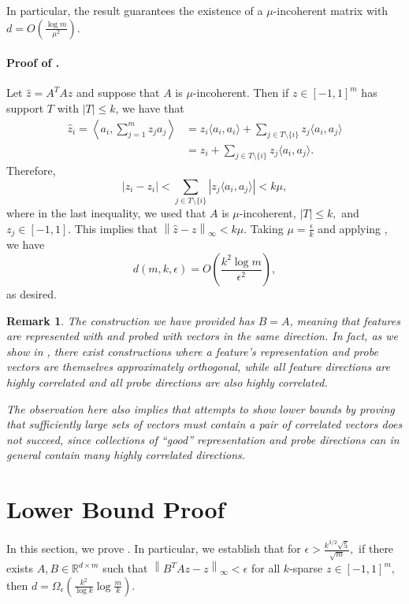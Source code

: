 \documentclass[11pt]{article}
\newtheorem{remark}[theorem]{Remark}
\newcommand{\RR}{\mathbb{R}}
\newcommand{\norm}[1]{\left\|#1\right\|}
\begin{document}
In particular, the result guarantees the existence of a $\mu$-incoherent matrix with $d = O(\frac{\log m}{\mu^2}).$ 

\paragraph{Proof of .}
Let $\hat{z}=A^TAz$ and suppose that $A$ is $\mu$-incoherent. Then if $z\in [-1,1]^m$ has support $T$ with $|T|\le k$, we have that
\begin{align}
    \hat{z}_i = \left\langle a_i, \sum_{j=1}^m z_ja_j\right\rangle
    &= z_i\langle a_i,a_i\rangle + \sum_{j\in T\setminus\{i\}} z_j\langle a_i,a_j\rangle\\
    &= z_i + \sum_{j\in T\setminus\{i\}} z_j\langle a_i,a_j\rangle.
\end{align}
Therefore,
\begin{equation}
    \left|\hat{z}_i - z_i\right| < \sum_{j\in T\setminus\{i\}} |z_j\langle a_i,a_j\rangle| < k\mu,
\end{equation}
where in the last inequality, we used that $A$ is $\mu$-incoherent, $|T|\le k,$ and $z_j\in [-1,1]$. This implies that $\norm{\hat{z}-z}_\infty < k\mu.$
Taking $\mu = \frac{\epsilon}{k}$ and applying , we have
\begin{equation}
    d(m,k,\epsilon) = O\left(\frac{k^2\log m}{\epsilon^2}\right),
\end{equation}
as desired.

\begin{remark}
The construction we have provided has $B=A$, meaning that features are represented with and probed with vectors in the same direction. In fact, as we show in , there exist constructions where a feature's representation and probe vectors are themselves approximately orthogonal, while all feature directions are highly correlated and all probe directions are also highly correlated.

The observation here also implies that attempts to show lower bounds by proving that sufficiently large sets of vectors must contain a pair of correlated vectors does not succeed, since collections of ``good'' representation and probe directions can in general contain many highly correlated directions.
\end{remark}

\section{Lower Bound Proof}\label{sec:lower-bound}
In this section, we prove . In particular, we establish that for $\epsilon > \frac{k^{3/2}\sqrt{5}}{\sqrt{m}},$ if there exists $A,B\in \RR^{d\times m}$ such that $\norm{B^TAz-z}_\infty < \epsilon$ for all $k$-sparse $z\in [-1,1]^m,$ then $d = \Omega_\epsilon(\frac{k^2}{\log k}\log \frac{m}{k}).$
\end{document}
